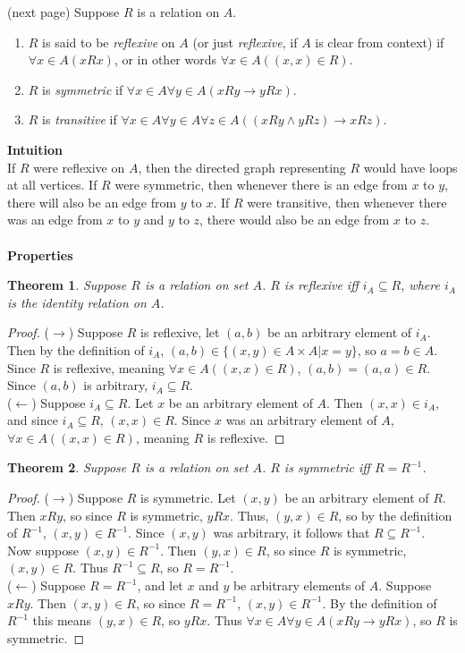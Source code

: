 \documentclass{report}
\newtheorem*{theorem}{Theorem}
\theoremstyle{definition}
\begin{document}
(next page)\newpage
{} Suppose $R$ is a relation on $A$. 
\begin{enumerate}
\item $R$ is said to be \textit{reflexive} on $A$ (or just \textit{reflexive}, if $A$ is clear from context) if $\forall x\in A(xRx)$, or in other words $\forall x\in A((x,x)\in R)$.
\item $R$ is \textit{symmetric} if $\forall x\in A\forall y\in A(xRy\to yRx)$.
\item $R$ is \textit{transitive} if $\forall x\in A\forall y\in A\forall z\in A((xRy\land yRz)\to xRz)$.
\end{enumerate}
\textbf{Intuition}\\
If $R$ were reflexive on $A$, then the directed graph representing $R$ would have loops at all vertices. If $R$ were symmetric, then whenever there is an edge from $x$ to $y$, there will also be an
edge from $y$ to $x$. If $R$ were transitive, then whenever there was an edge from $x$ to $y$ and $y$ to $z$, there would also be an edge from $x$ to $z$.\\
\vspace{1mm}\\
\textbf{Properties}
\begin{theorem}
Suppose $R$ is a relation on set $A$. $R$ is reflexive iff $i_A\subseteq R$, where
$i_A$ is the identity relation on $A$.
\end{theorem}
\begin{proof}
($\rightarrow$) Suppose $R$ is reflexive, let $(a,b)$ be an arbitrary element of $i_A$. Then by the definition of $i_A$, $(a,b)\in\{(x,y)\in A\times A|x=y\}$, so $a=b\in A$. Since $R$ is reflexive,
meaning $\forall x\in A((x,x)\in R)$, $(a,b)=(a,a)\in R$. Since $(a,b)$ is arbitrary, $i_A\subseteq R$.\\
\indent ($\leftarrow$) Suppose $i_A\subseteq R$. Let $x$ be an arbitrary element of $A$. Then $(x,x)\in i_A$, and since $i_A\subseteq R$, $(x,x)\in R$. Since $x$ was an arbitrary element of $A$, 
$\forall x\in A((x,x)\in R)$, meaning $R$ is reflexive.
\end{proof}
\begin{theorem}
Suppose $R$ is a relation on set $A$. $R$ is symmetric iff $R=R^{-1}$.
\end{theorem}
\begin{proof}
($\rightarrow$) Suppose $R$ is symmetric. Let $(x,y)$ be an arbitrary element of $R$. Then $xRy$, so since $R$ is symmetric, $yRx$. Thus, $(y,x)\in R$, so by the definition of $R^{-1}$, 
$(x,y)\in R^{-1}$. Since $(x,y)$ was arbitrary, it follows that $R\subseteq R^{-1}$.\\
\indent Now suppose $(x,y)\in R^{-1}$. Then $(y,x)\in R$, so since $R$ is symmetric, $(x,y)\in R$. Thus $R^{-1}\subseteq R$, so $R=R^{-1}$.\\
\indent($\leftarrow$) Suppose $R=R^{-1}$, and let $x$ and $y$ be arbitrary elements of $A$. Suppose $xRy$. Then $(x,y)\in R$, so since $R=R^{-1}$, $(x,y)\in R^{-1}$. By the definition of $R^{-1}$
this means $(y,x)\in R$, so $yRx$. Thus $\forall x\in A\forall y\in A(xRy\to yRx)$, so $R$ is symmetric.
\end{proof}
\end{document}

